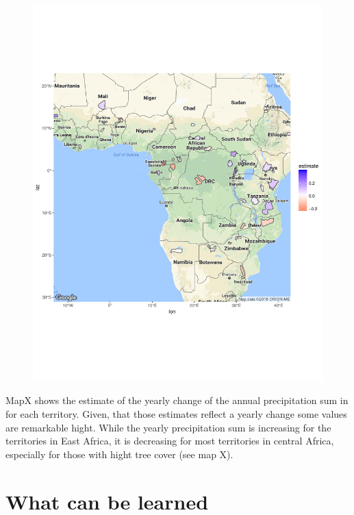 \begin{center}
	\begin{figure}[h]
		\begin{center}
			\includegraphics[width=15cm]{images/sample_session_3_change_map.pdf}
		\end{center}
	\end{figure}
\end{center}


MapX shows the estimate of the yearly change of the annual precipitation sum in for each territory. Given, that those estimates reflect a yearly change some values are remarkable hight. While the yearly precipitation sum is increasing for the territories in East Africa, it is decreasing for most territories in central Africa, especially for those with hight tree cover (see map X).

\section{What can be learned}



